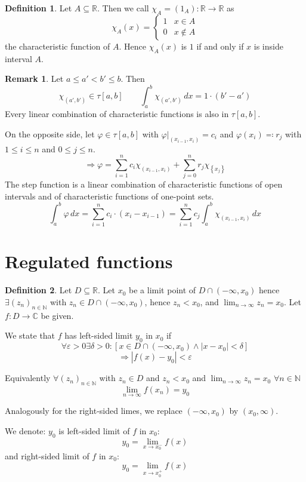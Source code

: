 \documentclass[a4paper,landscape,twocolumn]{article}
\theoremstyle{definition}
\newtheorem{defi}{Definition}
\newtheorem{rem}{Remark}
\newcommand\set[1]{\left\{#1\right\}}
\newcommand\abs[1]{\left|#1\right|}
\begin{document}
\begin{defi}
  Let $A \subseteq \mathbb R$. Then we call $\chi_A = (\mathcal 1_A): \mathbb R \to \mathbb R$ as
  \[ \chi_A(x) = \begin{cases} 1 & x \in A \\ 0 & x \not\in A \end{cases} \]
  the characteristic function of $A$. Hence $\chi_A(x)$ is $1$ if and only if $x$ is inside interval $A$.
\end{defi}
\begin{rem}
  Let $a \leq a' < b' \leq b$. Then
  \[ \chi_{(a',b')} \in \tau[a,b] \qquad \int_a^b \chi_{(a',b')} \, dx = 1 \cdot (b' - a') \]
  Every linear combination of characteristic functions is also in $\tau[a,b]$.

  On the opposite side, let $\varphi \in \tau[a,b]$ with $\varphi|_{(x_{i-1},x_i)} = c_i$
  and $\varphi(x_i) \eqqcolon r_j$ with $1 \leq i \leq n$ and $0 \leq j \leq n$.
  \[
    \Rightarrow \varphi = \sum_{i=1}^n c_i \chi_{(x_{i-1},x_i)}
    + \sum_{j=0}^n r_j \chi_{\set{x_j}}
  \]
  The step function is a linear combination of characteristic functions
  of open intervals and of characteristic functions of one-point sets.
  \[
    \int_a^b \varphi \, dx
    = \sum_{i=1}^n c_i \cdot (x_i - x_{i-1})
    = \sum_{i=1}^n c_j \int_a^b \chi_{(x_{i-1},x_i)} \, dx
  \]
\end{rem}

\section{Regulated functions}

\begin{defi}
  Let $D \subseteq \mathbb R$. Let $x_0$ be a limit point of $D \cap (-\infty, x_0)$
  hence $\exists (z_n)_{n \in \mathbb N}$ with $z_n \in D \cap (-\infty, x_0)$,
  hence $z_n < x_0$, and $\lim_{n\to\infty} z_n = x_0$.
  Let $f: D \to \mathbb C$ be given.

  We state that $f$ has left-sided limit $y_0$ in $x_0$ if
  \[ \forall \varepsilon > 0 \exists \delta > 0: \left[x \in D \cap (-\infty, x_0) \land \abs{x - x_0} < \delta \right] \]
  \[ \Rightarrow \abs{f(x) - y_0} < \varepsilon \]

  Equivalently $\forall (z_n)_{n\in\mathbb N}$ with $z_n \in D$
  and $z_n < x_0$ and $\lim_{n\to\infty} z_n = x_0$ $\forall n \in \mathbb N$
  \[ \lim_{n\to\infty} f(x_n) = y_0 \]

  Analogously for the right-sided limes, we replace $(-\infty, x_0)$ by $(x_0, \infty)$.

  We denote: $y_0$ is left-sided limit of $f$ in $x_0$:
  \[ y_0 = \lim_{x\to x_0^-} f(x) \]
  and right-sided limit of $f$ in $x_0$:
  \[ y_0 = \lim_{x\to x_0^+} f(x) \]
\end{defi}
\end{document}
